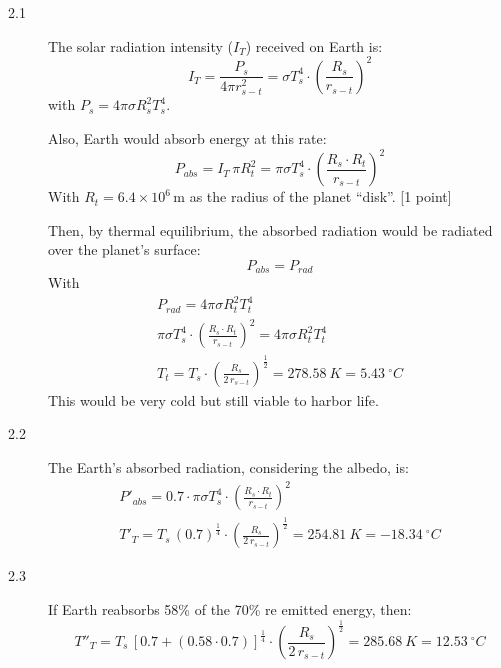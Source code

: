 \begin{description}
\item[2.1] The solar radiation intensity ($I_T$) received on Earth is:
  \[
  I_T = \frac{P_s}{4\pi r_{s-t}^2} = \sigma T_s^4\cdot\left(\frac{R_s}{r_{s-t}}\right)^{2} \tag*{[1 point]}
  \]
  with $P_s = 4\pi\sigma R_s^2 T_s^4$.

  Also, Earth would absorb energy at this rate:
  \[
  P_{abs} = I_T\,\pi R_t^2 = \pi\sigma T_s^4\cdot\left(\frac{R_s\cdot R_t}{r_{s-t}}\right)^{2}
  \]
  With $R_t = 6.4\times10^{6}$\,m as the radius of the planet ``disk''.
  \hfill[1 point]

  Then, by thermal equilibrium, the absorbed radiation would be radiated over
  the planet's surface:
  \[
  P_{abs} = P_{rad}
  \]
  With
  \begin{gather*}
  P_{rad} = 4\pi\sigma R_t^2 T_t^4\\
  \pi\sigma T_s^4\cdot\left(\frac{R_s\cdot R_t}{r_{s-t}}\right)^{2}
    = 4\pi\sigma R_t^2 T_t^4 \tag*{[1 point]}\\
  T_t = T_s\cdot\left(\frac{R_s}{2\,r_{s-t}}\right)^{\frac{1}{2}}
    = 278.58~K = 5.43~^\circ C \tag*{[1 point]}
  \end{gather*}
  This would be very cold but still viable to harbor life.
\item[2.2] The Earth's absorbed radiation, considering the albedo, is:
  \begin{gather*}
  P'_{abs} = 0.7\cdot\pi\sigma T_s^4\cdot\left(\frac{R_s\cdot R_t}{r_{s-t}}\right)^{2} \tag*{[1 point]}\\
  T'_T = T_s\,(0.7)^{\frac{1}{4}}\cdot\left(\frac{R_s}{2\,r_{s-t}}\right)^{\frac{1}{2}}
    = 254.81~K = -18.34~^\circ C \tag*{[1 point]}
  \end{gather*}
\item[2.3] If Earth reabsorbs 58\% of the 70\% re emitted energy, then:
  \[
  T''_T = T_s\,[0.7 + (0.58\cdot0.7)]^{\frac{1}{4}}
    \cdot\left(\frac{R_s}{2\,r_{s-t}}\right)^{\frac{1}{2}}
    = 285.68~K = 12.53~^\circ C \tag*{[4 points]}
  \]
\end{description}
